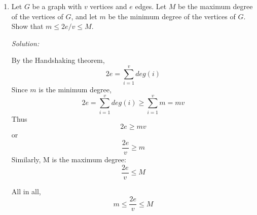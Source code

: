 \documentclass[a4paper]{article}
\begin{document}
\begin{enumerate}
\begin{figure}[H]
		\end{figure}
		\item Let $G$ be a graph with $v$ vertices and $e$ edges. Let $M$ be the maximum degree of the vertices of $G$, and let $m$ be the minimum degree of the vertices of $G$. Show that $m \leq 2e/v \leq M$.
		
		\emph{Solution: }
		
		By the Handshaking theorem,
		\begin{equation*}
			2e = \sum_{i=1}^{v} deg(i)
		\end{equation*}
		Since $m$ is the minimum degree,
		\begin{equation*}
			2e = \sum_{i=1}^{v} deg(i) \geq \sum_{i=1}^{v} m = mv
		\end{equation*}
		Thus
		\begin{equation*}
			2e \geq mv
		\end{equation*}
		or
		\begin{equation*}
			\frac{2e}{v} \geq m
		\end{equation*}
		Similarly, M is the maximum degree: 
		\begin{equation*}
			\frac{2e}{v} \leq M
		\end{equation*}
		
		All in all,
		\begin{equation*}
			m \leq \frac{2e}{v} \leq M
		\end{equation*}
	\end{enumerate}
	
\end{document}
